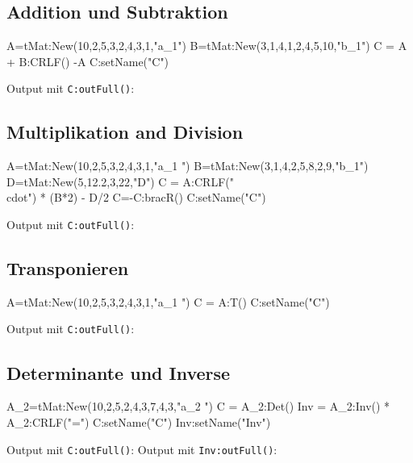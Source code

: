\subsection{Addition und Subtraktion}
\begin{luacode*}
A=tMat:New({{10,2,5,3},{2,4,3,1}},"a_{1}")
B=tMat:New({{3,1,4,1},{2,4,5,10}},"b_{1}")
C = A + B:CRLF() -A
C:setName("C")
\end{luacode*}
Output mit \lstinline{C:outFull()}:
\subsection{Multiplikation and Division}
\begin{luacode*}
	A=tMat:New({{10,2,5,3},{2,4,3,1}},"a_{1}	")
	B=tMat:New({{3,1},{4,2},{5,8},{2,9}},"b_{1}")
	D=tMat:New({{5,12.2},{3,22}},"D")	
	C = A:CRLF("\\cdot") * (B*2) - D/2
	C=-C:bracR()
	C:setName("C")
\end{luacode*}
Output mit \lstinline{C:outFull()}:
\subsection{Transponieren}
\begin{luacode*}
	A=tMat:New({{10,2,5,3},{2,4,3,1}},"a_{1}	")
	C = A:T()
	C:setName("C")
\end{luacode*}
Output mit \lstinline{C:outFull()}:
\subsection{Determinante und Inverse}
\begin{luacode*}
	A_2=tMat:New({{10,2,5},{2,4,3},{7,4,3}},"a_{2}	")
	C = A_2:Det()
	Inv = A_2:Inv() * A_2:CRLF("=")
	C:setName("C")
	Inv:setName("Inv")
\end{luacode*}
Output mit \lstinline{C:outFull()}:
Output mit \lstinline{Inv:outFull()}:

